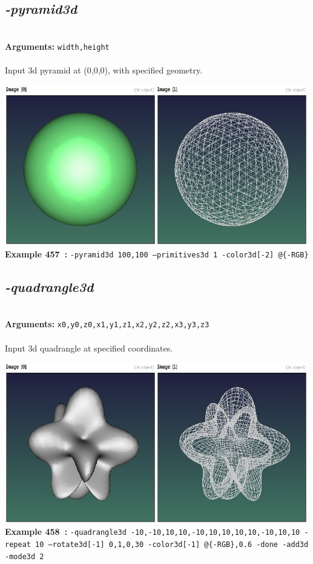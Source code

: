 \documentclass[a4paper,11pt,twoside]{book}
\begin{document}
\subsection{\emph{-pyramid3d} }\vspace*{-0.5em}
~\\\textbf{Arguments: } 
{\small \texttt{width,height}}\\~\\
Input 3d pyramid at (0,0,0), with specified geometry.
\begin{center}\includegraphics[keepaspectratio=true,height=7cm,width=\textwidth]{img/gmic_def457.jpg}\\
{\footnotesize \textbf{Example 457~:} \texttt{-pyramid3d 100,100 --primitives3d 1 -color3d[-2] @\{-RGB\}}}
\end{center}

\subsection{\emph{-quadrangle3d} }\vspace*{-0.5em}
~\\\textbf{Arguments: } 
{\small \texttt{x0,y0,z0,x1,y1,z1,x2,y2,z2,x3,y3,z3}}\\~\\
Input 3d quadrangle at specified coordinates.
\begin{center}\includegraphics[keepaspectratio=true,height=7cm,width=\textwidth]{img/gmic_def458.jpg}\\
{\footnotesize \textbf{Example 458~:} \texttt{-quadrangle3d -10,-10,10,10,-10,10,10,10,10,-10,10,10 -repeat 10 --rotate3d[-1] 0,1,0,30 -color3d[-1] @\{-RGB\},0.6 -done -add3d -mode3d 2}}
\end{center}
\end{document}
